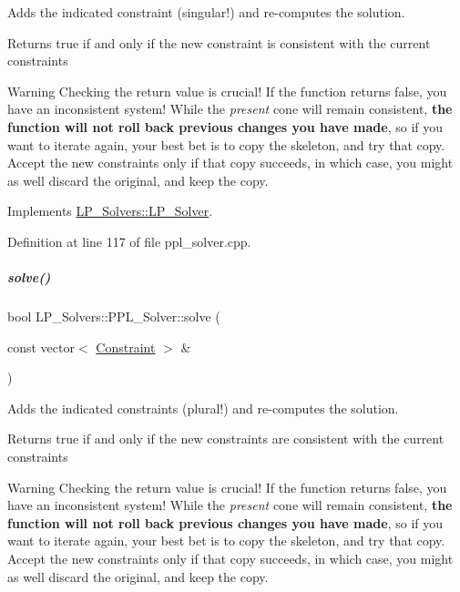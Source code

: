 Adds the indicated constraint (singular!) and re-\/computes the solution. 

\begin{DoxyReturn}{Returns}
{\ttfamily true} if and only if the new constraint is consistent with the current constraints
\end{DoxyReturn}
\begin{DoxyWarning}{Warning}
Checking the return value is crucial! If the function returns {\ttfamily false}, you have an inconsistent system! While the {\itshape present} cone will remain consistent, {\bfseries the function will not roll back previous changes you have made}, so if you want to iterate again, your best bet is to copy the skeleton, and try that copy. Accept the new constraints only if that copy succeeds, in which case, you might as well discard the original, and keep the copy. 
\end{DoxyWarning}


Implements \hyperlink{group___c_l_s_solvers_a8b9979fb228ac9ccfe037ad6ca48b314}{L\+P\+\_\+\+Solvers\+::\+L\+P\+\_\+\+Solver}.



Definition at line 117 of file ppl\+\_\+solver.\+cpp.

\mbox{\label{group___c_l_s_solvers_a6f73ee7b0d42f78fd95e399c474b3eb4}} 
\subparagraph{\texorpdfstring{solve()}{solve()}\hspace{0.1cm}{\footnotesize\ttfamily [2/2]}}
{\footnotesize\ttfamily bool L\+P\+\_\+\+Solvers\+::\+P\+P\+L\+\_\+\+Solver\+::solve (\begin{DoxyParamCaption}\item[{const vector$<$ \hyperlink{group___c_l_s_solvers_class_l_p___solvers_1_1_constraint}{Constraint} $>$ \&}]{ }\end{DoxyParamCaption})\hspace{0.3cm}{\ttfamily [virtual]}}



Adds the indicated constraints (plural!) and re-\/computes the solution. 

\begin{DoxyReturn}{Returns}
{\ttfamily true} if and only if the new constraints are consistent with the current constraints
\end{DoxyReturn}
\begin{DoxyWarning}{Warning}
Checking the return value is crucial! If the function returns {\ttfamily false}, you have an inconsistent system! While the {\itshape present} cone will remain consistent, {\bfseries the function will not roll back previous changes you have made}, so if you want to iterate again, your best bet is to copy the skeleton, and try that copy. Accept the new constraints only if that copy succeeds, in which case, you might as well discard the original, and keep the copy. 
\end{DoxyWarning}


